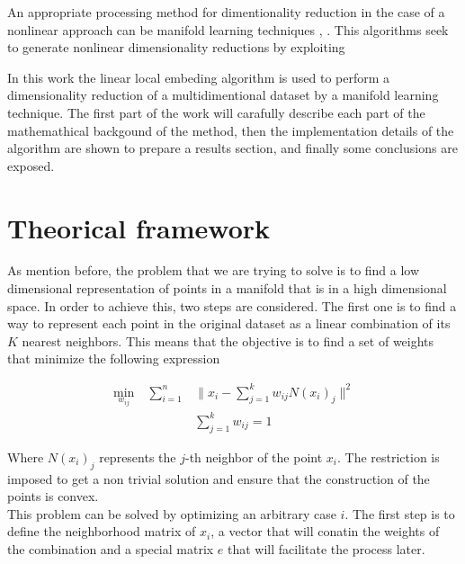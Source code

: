 \documentclass[12pt,journal]{IEEEtran}
\begin{document}
\vspace{0.25cm}

An appropriate processing method for dimentionality reduction in the case of
a nonlinear approach can be manifold learning techniques \cite{manifold1},
\cite{manifold2}. This algorithms seek to generate nonlinear dimensionality
reductions by exploiting

\cite{lle}

In this work the linear local embeding algorithm is used to perform a
dimensionality reduction of a multidimentional dataset by a manifold learning
technique. The first part of the work will carafully describe each part of the
mathemathical backgound of the method, then the implementation details of the
algorithm are shown to prepare a results section, and finally some conclusions
are exposed.

\section{Theorical framework}

    As mention before, the problem that we are trying to solve is to find
    a low dimensional representation of points in a manifold that is in a high
    dimensional space. In order to achieve this, two steps are considered. The
    first one is to find a way to represent each point in the original dataset as
    a linear combination of its $K$ nearest neighbors. This means that the
    objective is to find a set of weights that minimize the following
    expression

    \begin{equation*}
        \begin{aligned}
            \underset{w_{ij}}{\text{min}} \quad \sum_{i=1}^n & \lVert x_i - \sum_{j=1}^k w_{ij} N(x_i)_j \rVert^2 \\
            & \sum_{j=1}^k w_{ij} = 1
        \end{aligned}
    \end{equation*}

    Where $N(x_i)_j$ represents the $j$-th neighbor of the point $x_i$. The
    restriction is imposed to get a non trivial solution and ensure that
    the construction of the points is convex.\\

    This problem can be solved by optimizing an arbitrary case $i$. The first
    step is to define the neighborhood matrix of $x_i$, a vector that will
    conatin the weights of the combination and a special matrix $e$ that will
    facilitate the process later.
\end{document}
